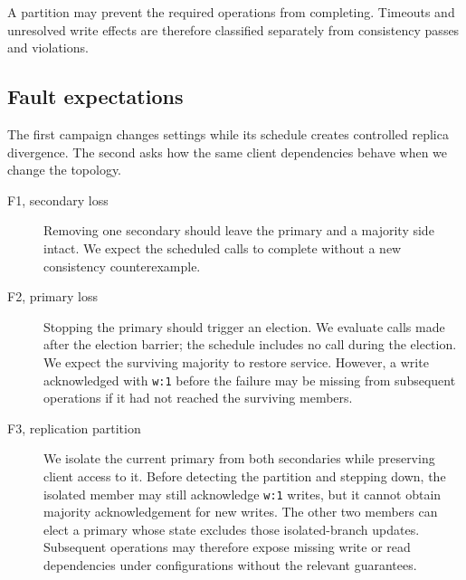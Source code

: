 A partition may prevent the required operations from completing.
Timeouts and unresolved write effects are therefore classified separately from consistency passes and violations.

\subsection{Fault expectations}

The first campaign changes settings while its schedule creates controlled
replica divergence. The second asks how the same client dependencies behave
when we change the topology.

\begin{description}
\item[F1, secondary loss] Removing one secondary should leave the primary and
a majority side intact. We expect the scheduled calls to complete without a
new consistency counterexample.
\item[F2, primary loss] Stopping the primary should trigger an election. We evaluate calls made after the election barrier; the schedule includes no call during the election. We expect the
surviving majority to restore service. However, a write acknowledged with \texttt{w:1} before the failure may be missing from subsequent operations if it had not reached the surviving members. 
\item[F3, replication partition] We isolate the current primary from both secondaries while preserving client access to it. Before detecting the partition and stepping down, the isolated member may still acknowledge \texttt{w:1} writes, but it cannot obtain majority acknowledgement for new writes. The other two
members can elect a primary whose state excludes those isolated-branch updates. Subsequent operations may therefore expose missing write or
read dependencies under configurations without the relevant guarantees.

\end{description}
